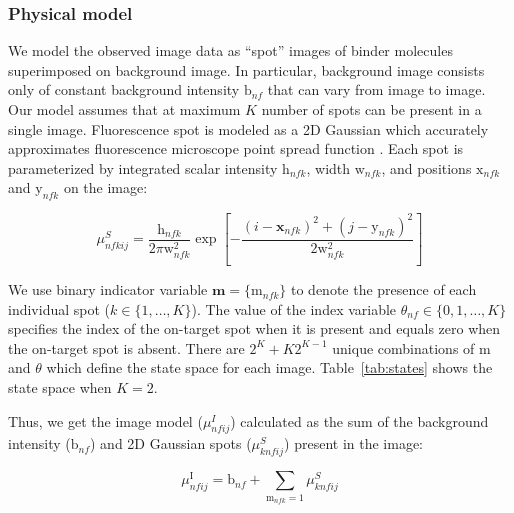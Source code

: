 \subsubsection{Physical model}

We model the observed image data as ``spot'' images of binder molecules superimposed on background image. In particular, background image consists only of constant background intensity $\mathrm{b}_{nf}$ that can vary from image to image. Our model assumes that at maximum $K$ number of spots can be present in a single image.  Fluorescence spot is modeled as a 2D Gaussian which accurately approximates fluorescence microscope point spread function \citep{Zhang2007-rb}. Each spot is parameterized by integrated scalar intensity $\mathrm{h}_{nfk}$, width $\mathrm{w}_{nfk}$, and positions $\mathrm{x}_{nfk}$ and $\mathrm{y}_{nfk}$ on the image:

\begin{equation}
    \mu^{S}_{nfkij} =
        \dfrac{\mathrm{h}_{nfk}}{2 \pi \mathrm{w}^2_{nfk}} \exp{\left[ -\dfrac{(i-\mathbf{x}_{nfk})^2 + (j-\mathrm{y}_{nfk})^2}{2\mathrm{w}^2_{nfk}} \right]}
\end{equation}

We use binary indicator variable $\mathbf{m} = \{\mathrm{m}_{nfk}\}$ to denote the presence of each individual spot ($k \in \{1,\dots,K\}$). The value of the index variable $\theta_{nf} \in \{0,1,\dots,K\}$ specifies the index of the on-target spot when it is present and equals zero when the on-target spot is absent. There are $2^K + K2^{K-1}$ unique combinations of $\mathrm{m}$ and $\theta$ which define the state space for each image. Table~\ref{tab:states} shows the state space when $K=2$.

Thus, we get the image model ($\mu^I_{nfij}$) calculated as the sum of the background intensity ($\mathrm{b}_{nf}$) and 2D Gaussian spots ($\mu^S_{knfij}$) present in the image:

\begin{equation}
    \mu^\mathrm{I}_{nfij} = \mathrm{b}_{nf} + \sum_{\mathrm{m}_{nfk}=1} \mu^S_{knfij}
\end{equation}

